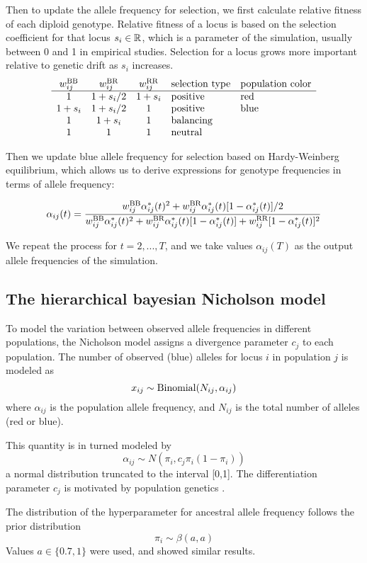 \documentclass[a4paper,12pt]{article}
\begin{document}
Then to update the allele frequency for selection, we first calculate
relative fitness of each diploid genotype. Relative fitness of a locus
is based on the selection coefficient for that locus $s_i\in \mathbb R$,
which is a parameter of the simulation, usually between 0 and 1 in
empirical studies. Selection for a locus grows more important relative
to genetic drift as $s_i$ increases.
$$
\begin{array}{cccll}
w_{ij}^{\text{BB}} & w_{ij}^{\text{BR}} & w_{ij}^{\text{RR}} & \text{selection type} & \text{population color}\\
\hline
1 & 1+s_i/2 & 1+s_i & \text{positive}& \text{red}\\
1+s_i & 1+s_i/2 & 1 & \text{positive}& \text{blue}\\
1 & 1+s_i & 1 & \text{balancing}& \\
1 & 1 & 1 & \text{neutral}& 
\end{array}
$$

Then we update blue allele frequency for selection based on
Hardy-Weinberg equilibrium, which allows us to derive expressions for
genotype frequencies in terms of allele frequency:

$$\alpha_{ij}(t) = \frac{
w_{ij}^{\text{BB}}\alpha_{ij}^*(t)^2 + w_{ij}^{\text{BR}}\alpha_{ij}^*(t)[1-\alpha_{ij}^*(t)]/2 }{
w_{ij}^{\text{BB}}\alpha_{ij}^*(t)^2 + w_{ij}^{\text{BR}}\alpha_{ij}^*(t)[1-\alpha_{ij}^*(t)] + w_{ij}^{\text{RR}}[1-\alpha_{ij}^*(t)]^2
   }$$

   We repeat the process for $t=2, ..., T$, and we take values
   $\alpha_{ij}(T)$ as the output allele frequencies of the
   simulation.



\subsection{The hierarchical bayesian Nicholson model}

To model the variation between observed allele frequencies in
different populations, the Nicholson model assigns a divergence
parameter $c_j$ to each population. The number of observed (blue)
alleles for locus $i$ in population $j$ is modeled as
$$x_{ij}\sim \operatorname{Binomial}(N_{ij},\alpha_{ij})$$
where $\alpha_{ij}$ is the population allele frequency, and $N_{ij}$
is the total number of alleles (red or blue).

This quantity is in turned modeled by
$$\alpha_{ij}\sim N(\pi_i, c_j\pi_i(1-\pi_i))$$
a normal distribution truncated to the interval [0,1]. The
differentiation parameter $c_j$ is motivated by population genetics
\cite[section 2.2]{nicholson}.

The distribution of the hyperparameter for ancestral allele frequency
follows the prior distribution
$$\pi_i\sim \beta(a,a)$$
Values $a\in\{0.7,1\}$ were used, and showed similar results.
\end{document}
